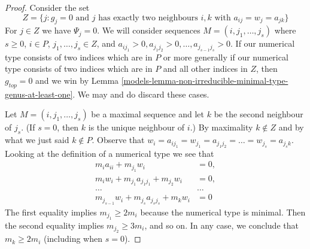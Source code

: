 \begin{proof}
\medskip\noindent
Consider the set
$$
Z = \{j : g_j = 0\text{ and }
j\text{ has exactly two neighbours }i, k\text{ with }
a_{ij} = w_j = a_{jk}\}
$$
For $j \in Z$ we have $\Psi_j = 0$. We will consider sequences
$M = (i, j_1, \ldots, j_s)$ where $s \geq 0$,
$i \in P$, $j_1, \ldots, j_s \in Z$, and
$a_{ij_1} > 0, a_{j_1j_2} > 0, \ldots, a_{j_{s - 1}j_s} > 0$.
If our numerical type consists of two indices which are in $P$
or more generally if our numerical type consists of
two indices which are in $P$ and all other indices in $Z$, then
$g_{top} = 0$ and we win by
Lemma \ref{models-lemma-non-irreducible-minimal-type-genus-at-least-one}.
We may and do discard these cases.

\medskip\noindent
Let $M = (i, j_1, \ldots, j_s)$ be a maximal sequence and let
$k$ be the second neighbour of $j_s$. (If $s = 0$, then $k$
is the unique neighbour of $i$.) By maximality $k \not \in Z$
and by what we just said $k \not \in P$. Observe that
$w_i = a_{ij_1} = w_{j_1} = a_{j_1j_2} = \ldots = w_{j_s} =
a_{j_sk}$. Looking at the definition
of a numerical type we see that
\begin{align*}
m_ia_{ii} + m_{j_1}w_i & = 0,\\
m_iw_i + m_{j_1}a_{j_1j_1} + m_{j_2}w_i & = 0,\\
\ldots & \ldots \\
m_{j_{s - 1}}w_i + m_{j_s}a_{j_sj_s} + m_kw_i & = 0
\end{align*}
The first equality implies $m_{j_1} \geq 2m_i$ because the
numerical type is minimal. Then the second equality implies
$m_{j_2} \geq 3m_i$, and so on. In any case, we conclude that
$m_k \geq 2m_i$ (including when $s = 0$).


\end{proof}
